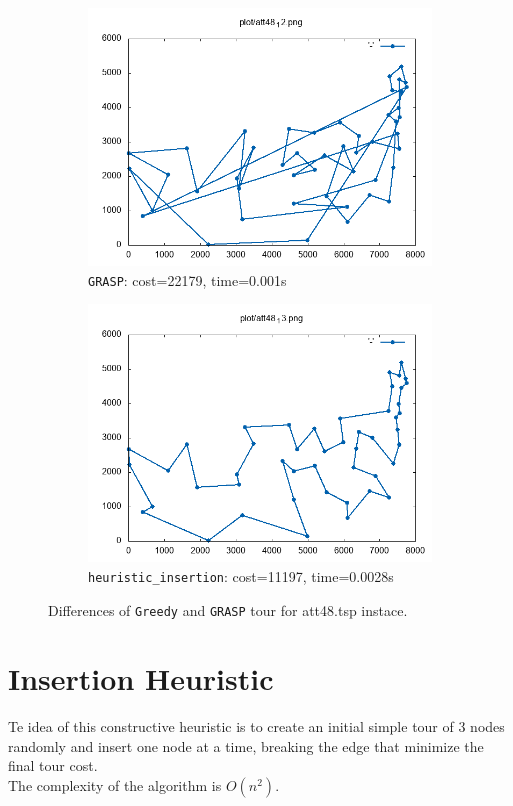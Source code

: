 \begin{figure}[!h]
\begin{subfigure}{.49\textwidth}
	\centering
	\includegraphics[width=\columnwidth]{../res/att48_12_3.png}
	\caption{\texttt{GRASP}: cost=22179, time=0.001s}
	\label{fig:att48_GRASP3}
	\end{subfigure}
	\begin{subfigure}{.49\textwidth}
	\centering
	\includegraphics[width=\columnwidth]{../res/att48_13.png}
	\caption{\texttt{heuristic\_insertion}: cost=11197, time=0.0028s}
	\label{fig:att48_insertion}
	\end{subfigure}
	\caption{Differences of \texttt{Greedy} and \texttt{GRASP} tour for att48.tsp instace.}
	\label{fig:att48_diff}
\end{figure}


\section{Insertion Heuristic}
Te idea of this constructive heuristic is to create an initial simple tour of 3 nodes randomly and insert one node at a time, breaking the edge that minimize the final tour cost.\\
The complexity of the algorithm is $ O(n^2) $.


